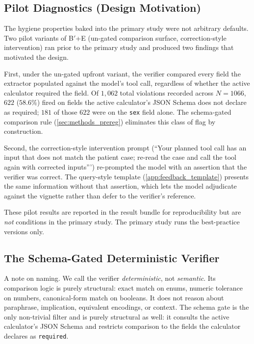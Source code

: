 \subsection{Pilot Diagnostics (Design Motivation)}
\label{sec:methods_pilots}

The hygiene properties baked into the primary study were not
arbitrary defaults. Two pilot variants of B$'$+E (un-gated comparison
surface, correction-style intervention) ran prior to the primary
study and produced two findings that motivated the design.

First, under the un-gated upfront variant, the verifier compared
every field the extractor populated against the model's tool call,
regardless of whether the active calculator required the field.
Of $1{,}062$ total violations recorded across $N=1066$, $622$
($58.6\%$) fired on fields the active calculator's JSON Schema does
not declare as required; $181$ of those $622$ were on the
\verb|sex| field alone. The schema-gated comparison rule
(\cref{sec:methods_prereg}) eliminates this class of flag by
construction.

Second, the correction-style intervention prompt
(``Your planned tool call has an input that does not match the
patient case; re-read the case and call the tool again with
corrected inputs''') re-prompted the model with an assertion that
the verifier was correct. The query-style template
(\cref{app:feedback_template}) presents the same information without
that assertion, which lets the model adjudicate against the vignette
rather than defer to the verifier's reference.

These pilot results are reported in the result bundle for
reproducibility but are \emph{not} conditions in the primary study.
The primary study runs the best-practice versions only.

\subsection{The Schema-Gated Deterministic Verifier}
\label{sec:methods_verifier}

A note on naming. We call the verifier \emph{deterministic}, not
\emph{semantic}. Its comparison logic is purely structural: exact
match on enums, numeric tolerance on numbers, canonical-form match
on booleans. It does not reason about paraphrase, implication,
equivalent encodings, or context. The schema gate is the only
non-trivial filter and is purely structural as well: it consults the
active calculator's JSON Schema and restricts comparison to the
fields the calculator declares as \texttt{required}.

